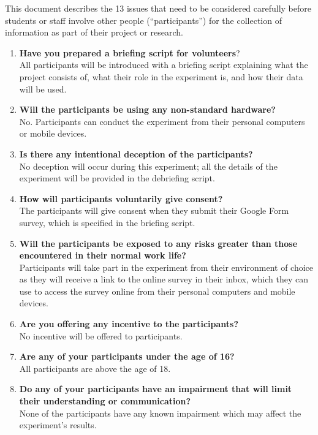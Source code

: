 This document describes the 13 issues that need to be considered carefully before students or staff  involve other people (``participants'') for the collection of information as part of their project or research.

\begin{enumerate}
    \item \textbf{Have you prepared a briefing script for volunteers}?\\
    All participants will be introduced with a briefing script explaining what the project consists of, what their role in the experiment is, and how their data will be used.
    \item \textbf{Will the participants be using any non-standard hardware?}\\
    No. Participants can conduct the experiment from their personal computers or mobile devices.
    \item \textbf{Is there any intentional deception of the participants?}\\
    No deception will occur during this experiment; all the details of the experiment will be provided in the debriefing script.
    \item \textbf{How will participants voluntarily give consent?}\\
    The participants will give consent when they submit their Google Form survey, which is specified in the briefing script.
    \item \textbf{Will the participants be exposed to any risks greater than those encountered in their normal work life?}\\
    Participants will take part in the experiment from their environment of choice as they will receive a link to the online survey in their inbox, which they can use to access the survey online from their personal computers and mobile devices.
    \item \textbf{Are you offering any incentive to the participants?}\\
    No incentive will be offered to participants.
    \item \textbf{Are any of your participants under the age of 16?}\\
    All participants are above the age of 18.
    \item \textbf{Do any of your participants have an impairment that will limit their understanding or communication?}\\
    None of the participants have any known impairment which may affect the experiment's results.

\end{enumerate}
